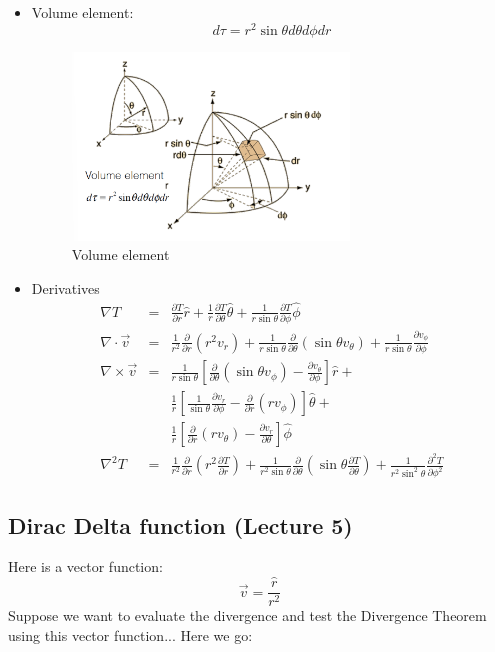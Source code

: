 \documentclass[12pt,a4paper,twoside]{article}
\begin{document}
\begin{itemize}
		\item Volume element:
		\[d\tau =r^2\sin\theta d\theta d\phi dr\]
		\begin{figure}[h]
			\centering
			\includegraphics[height=5cm]{250-Revision/spherical-dtau.png}
			\caption{Volume element}
			\label{fig:spherical-dtau}
		\end{figure}
		
		\item Derivatives
		\begin{eqnarray*}
			\nabla T &=& \frac{\partial T}{\partial r}\hat{r} + \frac{1}{r}\frac{\partial T}{\partial \theta}\hat{\theta} + \frac{1}{r\sin\theta}\frac{\partial T}{\partial \phi}\hat{\phi}\\
			\nabla \cdot \overrightarrow{v} &=& \frac{1}{r^2}\frac{\partial}{\partial r}(r^2v_r) +\frac{1}{r\sin\theta}\frac{\partial}{\partial\theta}(\sin\theta v_\theta)+\frac{1}{r\sin\theta}\frac{\partial v_\phi}{\partial \phi}\\
			\nabla \times \overrightarrow{v} &=& \frac{1}{r\sin\theta}\left[\frac{\partial}{\partial \theta}(\sin\theta v_\phi)-\frac{\partial v_\theta}{\partial \phi}\right]\hat{r}+\\
			& & \frac{1}{r}\left[\frac{1}{\sin\theta}\frac{\partial v_r}{\partial \phi}-\frac{\partial}{\partial r}(rv_\phi)\right]\hat{\theta}+\\
			& & \frac{1}{r}\left[\frac{\partial}{\partial r}(rv_\theta)-\frac{\partial v_r}{\partial\theta}\right]\hat{\phi}\\
			\nabla^2T &=& \frac{1}{r^2}\frac{\partial}{\partial r}\left(r^2\frac{\partial T}{\partial r}\right) + \frac{1}{r^2\sin\theta}\frac{\partial}{\partial \theta}\left(\sin\theta\frac{\partial T}{\partial \theta}\right) +\frac{1}{r^2\sin^2\theta}\frac{\partial^2T}{\partial\phi^2} 
		\end{eqnarray*}
		
	\end{itemize}
	
	
	
	\subsection{Dirac Delta function (Lecture 5)}
	Here is a vector function:
	\[\overrightarrow{v} =\frac{\hat{r}}{r^2}\]
	Suppose we want to evaluate the divergence and test the Divergence Theorem using this vector function... Here we go:\\
	
\end{document}

